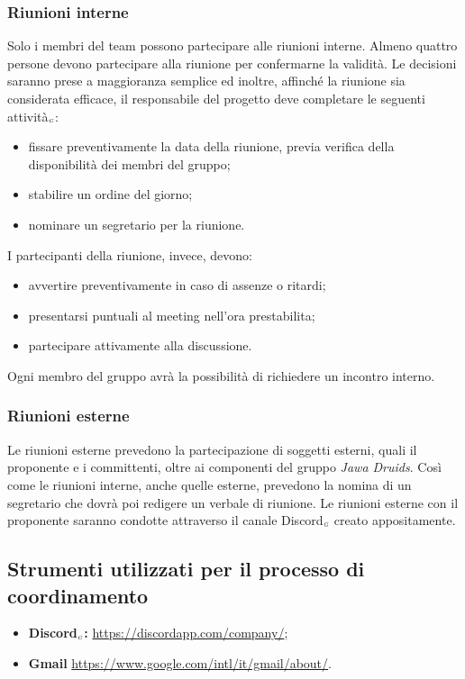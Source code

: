 \subsubsection{Riunioni interne}\label{ProcessiOrganizzativiProcessoDiCoordinamentoRiunioniRiunioniInterne}
Solo i membri del team possono partecipare alle riunioni interne. Almeno quattro persone devono partecipare alla riunione per confermarne la validità. Le decisioni saranno prese a maggioranza semplice ed inoltre, affinché la riunione sia considerata efficace, il responsabile del progetto deve completare le seguenti attività$_{\scaleto{G}{3pt}}$:
\begin{itemize}
\item fissare preventivamente la data della riunione, previa verifica della disponibilità dei membri del gruppo;
\item stabilire un ordine del giorno;
\item nominare un segretario per la riunione.
\end{itemize}
I partecipanti della riunione, invece, devono:
\begin{itemize}
	\item avvertire preventivamente in caso di assenze o ritardi;
	\item presentarsi puntuali al meeting nell'ora prestabilita;
	\item partecipare attivamente alla discussione.
\end{itemize}
Ogni membro del gruppo avrà la possibilità di richiedere un incontro interno.
\subsubsection{Riunioni esterne}\label{ProcessiOrganizzativiProcessoDiCoordinamentoRiunionRiunioniEsterne}
Le riunioni esterne prevedono la partecipazione di soggetti esterni, quali il proponente e i committenti, oltre ai componenti del gruppo \textit{Jawa Druids}.
Così come le riunioni interne, anche quelle esterne, prevedono la nomina di un segretario che dovrà poi redigere un verbale di riunione.
Le riunioni esterne con il proponente saranno condotte attraverso il canale Discord$_{\scaleto{G}{3pt}}$ creato appositamente.
\subsection{Strumenti utilizzati per il processo di coordinamento}\label{ProcessiOrganizzativiProcessoDiCoordinamentoStrumentiUtilizzatiPerIlProcessoDiCoordinamento}
\begin{itemize}
	\item \textbf{Discord$_{\scaleto{G}{3pt}}$:} \url{https://discordapp.com/company/};
	\item \textbf{Gmail} \url{https://www.google.com/intl/it/gmail/about/}.
\end{itemize}

